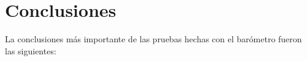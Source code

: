 \documentclass[spanish,12pt,a4paper,titlepage]{report}
\begin{document}






\newpage
\section{Conclusiones}
\label{sec:conclusiones}

La conclusiones más importante de las pruebas hechas con el barómetro fueron las siguientes:
\end{document}

